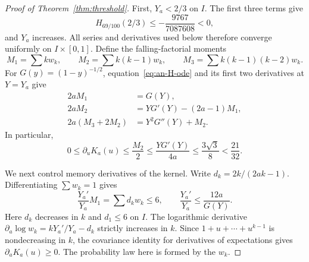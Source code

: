 \begin{proof}[Proof of Theorem~\ref{thm:threshold}]
First, $Y_a<2/3$ on $I$. The first three terms give
\[
 H_{69/100}(2/3)\le-\frac{9767}{7087608}<0,
\]
and $Y_a$ increases. All series and derivatives used below
therefore converge uniformly on $I\times[0,1]$.
Define the falling-factorial moments
\[
 M_1=\sum k w_k,\qquad M_2=\sum k(k-1)w_k,\qquad
 M_3=\sum k(k-1)(k-2)w_k.
\]
For $G(y)=(1-y)^{-1/2}$, equation~\eqref{eq:an-H-ode} and its
first two derivatives at $Y=Y_a$ give
\begin{equation}\label{eq:an-factorial-moments}
 \begin{split}
 2aM_1&=G(Y),\\
 2aM_2&=YG'(Y)-(2a-1)M_1,\\
 2a(M_3+2M_2)&=Y^2G''(Y)+M_2.
 \end{split}
\end{equation}
In particular,
\begin{equation}\label{eq:an-Ku}
 0\le\partial_uK_a(u)\le\frac{M_2}{2}
 \le\frac{YG'(Y)}{4a}
 \le\frac{3\sqrt3}{8}<\frac{21}{32}.
\end{equation}

We next control memory derivatives of the kernel. Write
$d_k=2k/(2ak-1)$. Differentiating $\sum w_k=1$ gives
\begin{equation}\label{eq:an-root-derivative}
 \frac{Y_a'}{Y_a}M_1=\sum d_kw_k\le6,
 \qquad \frac{Y_a'}{Y_a}\le\frac{12a}{G(Y)}.
\end{equation}
Here $d_k$ decreases in $k$ and $d_1\le6$ on $I$.
The logarithmic derivative $\partial_a\log w_k=kY_a'/Y_a-d_k$
strictly increases in $k$. Since $1+u+\cdots+u^{k-1}$
is nondecreasing in $k$, the covariance identity for
derivatives of expectations gives $\partial_aK_a(u)\ge0$.
The probability law here is formed by the $w_k$.


\end{proof}
